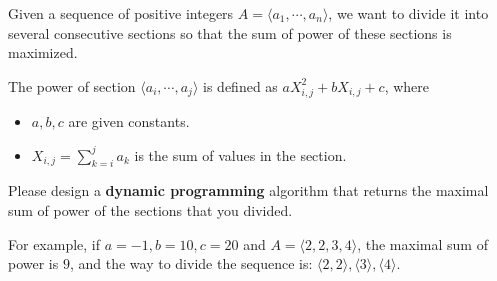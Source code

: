
Given a sequence of positive integers $A=\langle a_1,\cdots,a_n\rangle$, we want to divide it into several consecutive sections so that the sum of power of these sections 
is maximized.

The power of section $\langle a_i,\cdots,a_j\rangle$ is defined as $aX_{i,j}^2+bX_{i,j}+c$, where
\begin{itemize}
    \item $a,b,c$ are given constants.
    \item $X_{i,j}=\sum\limits_{k=i}^j a_k$ is the sum of values in the section.
\end{itemize}

Please design a \textbf{dynamic programming} algorithm that returns the maximal sum of power of the sections that you divided.

For example, if \(a=-1,b=10,c=20\) and \(A=\langle 2,2,3,4\rangle\), the maximal sum of power is \(9\), and the way to divide the sequence is: \(\langle 2,2\rangle,\langle 3\rangle,\langle 4\rangle\).

